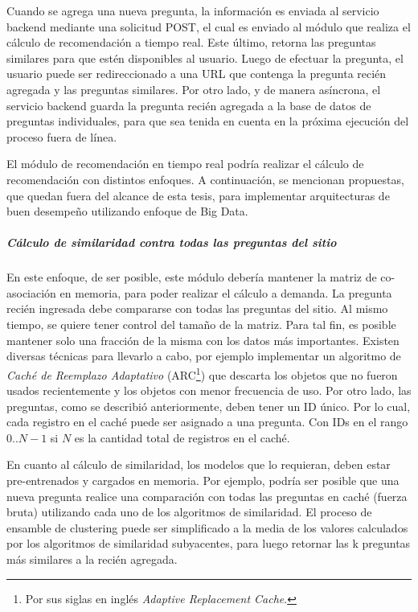 \bigskip Cuando se agrega una nueva pregunta, la información es enviada al servicio backend mediante una solicitud POST, el cual es enviado al módulo que realiza el cálculo de recomendación a tiempo real. Este último, retorna las preguntas similares para que estén disponibles al usuario. Luego de efectuar la pregunta, el usuario puede ser redireccionado a una URL que contenga la pregunta recién agregada y las preguntas similares. Por otro lado, y de manera asíncrona, el servicio backend guarda la pregunta recién agregada a la base de datos de preguntas individuales, para que sea tenida en cuenta en la próxima ejecución del proceso fuera de línea.

\bigskip El módulo de recomendación en tiempo real podría realizar el cálculo de recomendación con distintos enfoques. A continuación, se mencionan propuestas, que quedan fuera del alcance de esta tesis, para implementar arquitecturas de buen desempeño utilizando enfoque de Big Data.

\subparagraph{Cálculo de similaridad contra todas las preguntas del sitio}
En este enfoque, de ser posible, este módulo debería mantener la matriz de co-asociación en memoria, para poder realizar el cálculo a demanda. La pregunta recién ingresada debe compararse con todas las preguntas del sitio. Al mismo tiempo, se quiere tener control del tamaño de la matriz. Para tal fin, es posible mantener solo una fracción de la misma con los datos más importantes. Existen diversas técnicas para llevarlo a cabo, por ejemplo implementar un algoritmo de \textit{Caché de Reemplazo Adaptativo }(ARC\footnote{Por sus siglas en inglés \textit{Adaptive Replacement Cache}.}) que descarta los objetos que no fueron usados recientemente y los objetos con menor frecuencia de uso. Por otro lado, las preguntas, como se describió anteriormente, deben tener un ID único. Por lo cual, cada registro en el caché puede ser asignado a una pregunta. Con IDs en el rango \(0.. N-1\) si \(N\) es la cantidad total de registros en el caché.

\bigskip En cuanto al cálculo de similaridad, los modelos que lo requieran, deben estar pre-entrenados y cargados en memoria. Por ejemplo, podría ser posible que una nueva pregunta realice una comparación con todas las preguntas en caché (fuerza bruta) utilizando cada uno de los algoritmos de similaridad. El proceso de ensamble de clustering puede ser simplificado a la media de los valores calculados por los algoritmos de similaridad subyacentes, para luego retornar las k preguntas más similares a la recién agregada.

